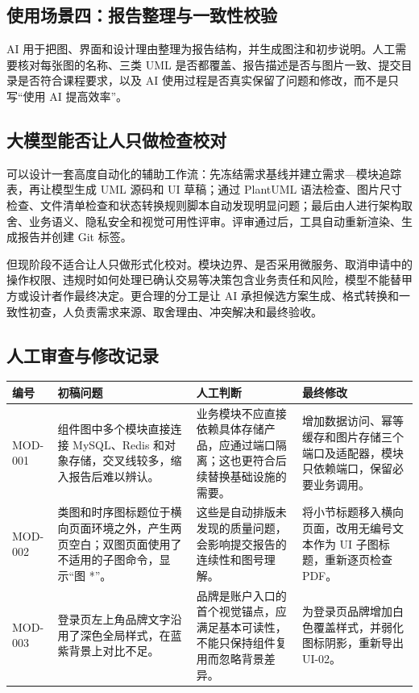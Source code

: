 \documentclass[12pt,a4paper]{ctexart}
\begin{document}
\subsection{使用场景四：报告整理与一致性校验}

AI 用于把图、界面和设计理由整理为报告结构，并生成图注和初步说明。人工需要核对每张图的名称、三类 UML 是否都覆盖、报告描述是否与图片一致、提交目录是否符合课程要求，以及 AI 使用过程是否真实保留了问题和修改，而不是只写“使用 AI 提高效率”。

\subsection{大模型能否让人只做检查校对}

可以设计一套高度自动化的辅助工作流：先冻结需求基线并建立需求—模块追踪表，再让模型生成 UML 源码和 UI 草稿；通过 PlantUML 语法检查、图片尺寸检查、文件清单检查和状态转换规则脚本自动发现明显问题；最后由人进行架构取舍、业务语义、隐私安全和视觉可用性评审。评审通过后，工具自动重新渲染、生成报告并创建 Git 标签。

但现阶段不适合让人只做形式化校对。模块边界、是否采用微服务、取消申请中的操作权限、违规时如何处理已确认交易等决策包含业务责任和风险，模型不能替甲方或设计者作最终决定。更合理的分工是让 AI 承担候选方案生成、格式转换和一致性初查，人负责需求来源、取舍理由、冲突解决和最终验收。

\subsection{人工审查与修改记录}

\begin{longtable}{L{0.12\textwidth}L{0.24\textwidth}L{0.27\textwidth}L{0.27\textwidth}}
\toprule
编号 & 初稿问题 & 人工判断 & 最终修改\\
\midrule
MOD-001 & 组件图中多个模块直接连接 MySQL、Redis 和对象存储，交叉线较多，缩入报告后难以辨认。 & 业务模块不应直接依赖具体存储产品，应通过端口隔离；这也更符合后续替换基础设施的需要。 & 增加数据访问、幂等缓存和图片存储三个端口及适配器，模块只依赖端口，保留必要业务调用。\\
MOD-002 & 类图和时序图标题位于横向页面环境之外，产生两页空白；双图页面使用了不适用的子图命令，显示“图 *”。 & 这些是自动排版未发现的质量问题，会影响提交报告的连续性和图号理解。 & 将小节标题移入横向页面，改用无编号文本作为 UI 子图标题，重新逐页检查 PDF。\\
MOD-003 & 登录页左上角品牌文字沿用了深色全局样式，在蓝紫背景上对比不足。 & 品牌是账户入口的首个视觉锚点，应满足基本可读性，不能只保持组件复用而忽略背景差异。 & 为登录页品牌增加白色覆盖样式，并弱化图标阴影，重新导出 UI-02。\\
\bottomrule
\end{longtable}
\end{document}
